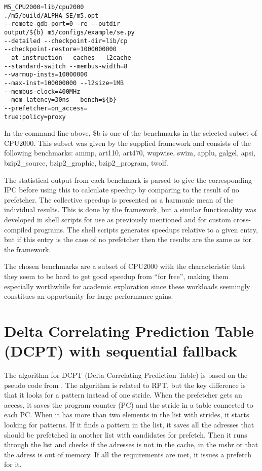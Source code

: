 \documentclass[12pt,journal,compsoc]{IEEEtran}
\begin{document}
\begin{verbatim}
M5_CPU2000=lib/cpu2000
./m5/build/ALPHA_SE/m5.opt
--remote-gdb-port=0 -re --outdir
output/${b} m5/configs/example/se.py
--detailed --checkpoint-dir=lib/cp
--checkpoint-restore=1000000000
--at-instruction --caches --l2cache
--standard-switch --membus-width=8
--warmup-insts=10000000
--max-inst=100000000 --l2size=1MB
--membus-clock=400MHz
--mem-latency=30ns --bench=${b}
--prefetcher=on_access=
true:policy=proxy
\end{verbatim}

In the command line above, \${b} is one of the benchmarks in the selected
subset of CPU2000. This subset was given by the supplied framework and consists
of the following benchmarks: ammp, art110, art470, wupwise, swim, applu,
galgel, apsi, bzip2\_source, bzip2\_graphic, bzip2\_program, twolf.

The statistical output from each benchmark is parsed to give the corresponding
IPC before using this to calculate speedup by comparing to the result
of no prefetcher. The collective speedup is presented as a harmonic mean of
the individual results. This is done by the framework, but a similar
functionality was developed in shell scripts for use as previously mentioned
and for custom cross-compiled programs. The shell scripts generates
speedups relative to a given entry, but if this entry is the case of no
prefetcher then the results are the same as for the framework.

The chosen benchmarks are a subset of CPU2000 with the characteristic that
they seem to be hard to get good speedup from ``for free'', making
them especially worthwhile for academic exploration since these workloads
seemingly constitues an opportunity for large performance gains.

\section{Delta Correlating Prediction Table (DCPT) with sequential fallback}
The algorithm for DCPT (Delta Correlating Prediction Table) is based on the pseudo code from \cite{dcptpaper}.
The algorithm is related to RPT, but the key difference is that it looks for a pattern instead of one stride.
When the prefetcher gets an access, it saves the program counter (PC) and the stride in a table connected to each PC. When it has more than two elements in the list with strides, it starts looking for patterns.
If it finds a pattern in the list, it saves all the adresses that should be prefetched in another list with candidates for prefetch.
Then it runs through the list and checks if the adresses is not in the cache, in the mshr or that the adress is out of memory. If all the requirements are met, it issues a prefetch for it.
\end{document}
